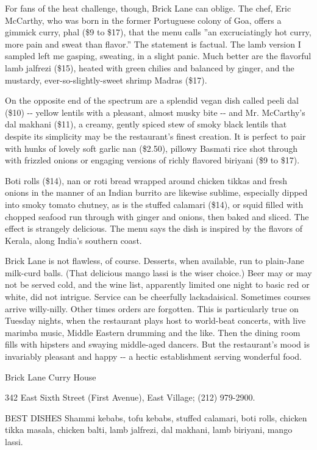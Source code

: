 For fans of the heat challenge, though, Brick Lane can oblige. The chef,
Eric McCarthy, who was born in the former Portuguese colony of Goa,
offers a gimmick curry, phal (\$9 to \$17), that the menu calls ''an
excruciatingly hot curry, more pain and sweat than flavor.'' The
statement is factual. The lamb version I sampled left me gasping,
sweating, in a slight panic. Much better are the flavorful lamb jalfrezi
(\$15), heated with green chilies and balanced by ginger, and the
mustardy, ever-so-slightly-sweet shrimp Madras (\$17).

On the opposite end of the spectrum are a splendid vegan dish called
peeli dal (\$10) -\/- yellow lentils with a pleasant, almost musky bite
-\/- and Mr. McCarthy's dal makhani (\$11), a creamy, gently spiced stew
of smoky black lentils that despite its simplicity may be the
restaurant's finest creation. It is perfect to pair with hunks of lovely
soft garlic nan (\$2.50), pillowy Basmati rice shot through with
frizzled onions or engaging versions of richly flavored biriyani (\$9 to
\$17).

Boti rolls (\$14), nan or roti bread wrapped around chicken tikkas and
fresh onions in the manner of an Indian burrito are likewise sublime,
especially dipped into smoky tomato chutney, as is the stuffed calamari
(\$14), or squid filled with chopped seafood run through with ginger and
onions, then baked and sliced. The effect is strangely delicious. The
menu says the dish is inspired by the flavors of Kerala, along India's
southern coast.

Brick Lane is not flawless, of course. Desserts, when available, run to
plain-Jane milk-curd balls. (That delicious mango lassi is the wiser
choice.) Beer may or may not be served cold, and the wine list,
apparently limited one night to basic red or white, did not intrigue.
Service can be cheerfully lackadaisical. Sometimes courses arrive
willy-nilly. Other times orders are forgotten. This is particularly true
on Tuesday nights, when the restaurant plays host to world-beat
concerts, with live marimba music, Middle Eastern drumming and the like.
Then the dining room fills with hipsters and swaying middle-aged
dancers. But the restaurant's mood is invariably pleasant and happy -\/-
a hectic establishment serving wonderful food.

Brick Lane Curry House

342 East Sixth Street (First Avenue), East Village; (212) 979-2900.

BEST DISHES Shammi kebabs, tofu kebabs, stuffed calamari, boti rolls,
chicken tikka masala, chicken balti, lamb jalfrezi, dal makhani, lamb
biriyani, mango lassi.

